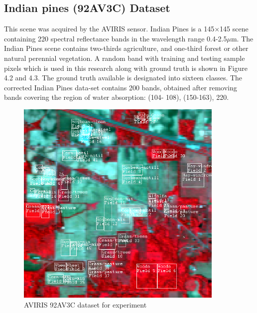 \documentclass[document.tex]{subfiles}
\begin{document}
\subsection{Indian pines (92AV3C) Dataset}
\noindent This scene was acquired by the AVIRIS sensor. Indian Pines is a 145$\times$145 scene containing
220 spectral reflectance bands in the wavelength range 0.4-2.5$\mu$m. The Indian Pines scene
contains two-thirds agriculture, and one-third forest or other natural perennial vegetation.
A random band with training and testing sample pixels which is used in this research along with ground truth is shown in Figure 4.2 and 4.3. The ground truth
available is designated into sixteen classes. The corrected Indian Pines data-set contains
200 bands, obtained after removing bands covering the region of water absorption: (104-
108), (150-163), 220.
\begin{figure}[H]
	\begin{center}
		\includegraphics[height=10.0cm]{imgs/Dataset.png}
	\end{center}
	\caption{AVIRIS 92AV3C dataset for experiment}
	\label{fig:AVIRIS 92AV3C dataset for experiment}
\end{figure}
\end{document}
